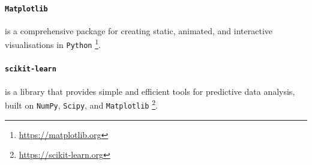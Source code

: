 \paragraph{\texttt{Matplotlib}} is a comprehensive package for creating 
static, animated, and interactive visualisations in \texttt{Python} 
\footnote{\url{https://matplotlib.org}}. 

\paragraph{\texttt{scikit-learn}} is a library that provides simple and efficient 
tools for predictive data analysis, built on \texttt{NumPy}, \texttt{Scipy}, and 
\texttt{Matplotlib} \footnote{\url{https://scikit-learn.org}}.



